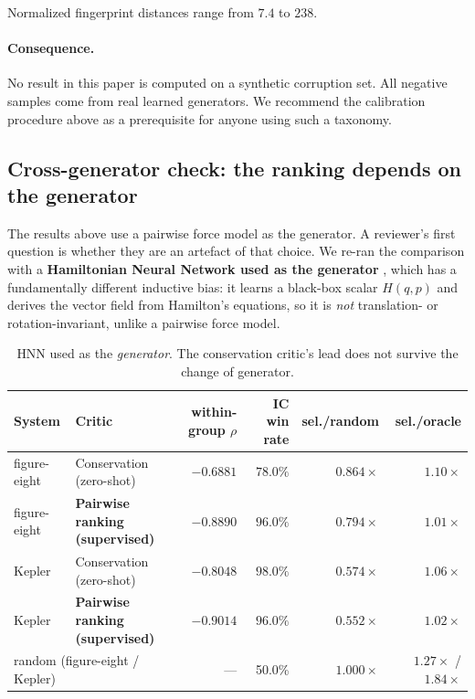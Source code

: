 \documentclass[11pt]{article}
\begin{document}
Normalized fingerprint distances range from $7.4$ to $238$.

\paragraph{Consequence.} No result in this paper is computed on a synthetic corruption
set. All negative samples come from real learned generators. We recommend the
calibration procedure above as a prerequisite for anyone using such a taxonomy.

\subsection{Cross-generator check: the ranking depends on the generator}
\label{sec:crossgen}

The results above use a pairwise force model as the generator. A reviewer's first
question is whether they are an artefact of that choice. We re-ran the comparison with a
\textbf{Hamiltonian Neural Network used as the generator} \cite{greydanus2019hnn}, which
has a fundamentally different inductive bias: it learns a black-box scalar $H(q,p)$ and
derives the vector field from Hamilton's equations, so it is \emph{not}
translation- or rotation-invariant, unlike a pairwise force model.

\begin{table}[t]
\centering
\footnotesize
\caption{HNN used as the \emph{generator}. The conservation critic's lead does not
survive the change of generator.}
\label{tab:crossgen}
\begin{tabular}{llrrrr}
\toprule
System & Critic & within-group $\rho$ & IC win rate & sel./random & sel./oracle \\
\midrule
figure-eight & Conservation (zero-shot) & $-0.6881$ & $78.0\%$ & $0.864\times$ & $1.10\times$ \\
figure-eight & \textbf{Pairwise ranking (supervised)} & $\mathbf{-0.8890}$ & $\mathbf{96.0\%}$ & $\mathbf{0.794\times}$ & $\mathbf{1.01\times}$ \\
Kepler & Conservation (zero-shot) & $-0.8048$ & $\mathbf{98.0\%}$ & $0.574\times$ & $1.06\times$ \\
Kepler & \textbf{Pairwise ranking (supervised)} & $\mathbf{-0.9014}$ & $96.0\%$ & $\mathbf{0.552\times}$ & $\mathbf{1.02\times}$ \\
\midrule
\multicolumn{2}{l}{random (figure-eight / Kepler)} & --- & 50.0\% & $1.000\times$ & $1.27\times$ / $1.84\times$ \\
\bottomrule
\end{tabular}
\end{table}
\end{document}
